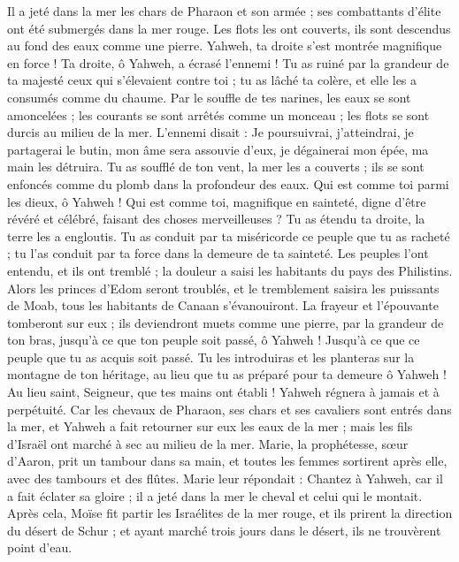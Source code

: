 \begin{multicols}{2}
Il a jeté dans la mer les chars de Pharaon et son armée ; ses combattants d’élite ont été submergés dans la mer rouge.
Les flots les ont couverts, ils sont descendus au fond des eaux comme une pierre\FTNT{}.
Yahweh, ta droite s'est montrée magnifique en force ! Ta droite, ô Yahweh, a écrasé l'ennemi\FTNT{} !
Tu as ruiné par la grandeur de ta majesté ceux qui s'élevaient contre toi ; tu as lâché ta colère, et elle les a consumés comme du chaume.
Par le souffle de tes narines, les eaux se sont amoncelées ; les courants se sont arrêtés comme un monceau ; les flots se sont durcis au milieu de la mer.
L'ennemi disait : Je poursuivrai, j'atteindrai, je partagerai le butin, mon âme sera assouvie d'eux, je dégainerai mon épée, ma main les détruira.
Tu as soufflé de ton vent, la mer les a couverts ; ils se sont enfoncés comme du plomb dans la profondeur des eaux.
Qui est comme toi parmi les dieux, ô Yahweh ! Qui est comme toi, magnifique en sainteté, digne d'être révéré et célébré, faisant des choses merveilleuses ?
Tu as étendu ta droite, la terre les a engloutis.
Tu as conduit par ta miséricorde ce peuple que tu as racheté ; tu l'as conduit par ta force dans la demeure de ta sainteté.
Les peuples l'ont entendu, et ils ont tremblé ; la douleur a saisi les habitants du pays des Philistins.
Alors les princes d'Edom seront troublés, et le tremblement saisira les puissants de Moab, tous les habitants de Canaan s’évanouiront.
La frayeur et l'épouvante tomberont sur eux ; ils deviendront muets comme une pierre, par la grandeur de ton bras, jusqu'à ce que ton peuple soit passé, ô Yahweh ! Jusqu'à ce que ce peuple que tu as acquis soit passé\FTNT{}.
Tu les introduiras et les planteras sur la montagne de ton héritage, au lieu que tu as préparé pour ta demeure ô Yahweh ! Au lieu saint, Seigneur, que tes mains ont établi !
Yahweh régnera à jamais et à perpétuité.
Car les chevaux de Pharaon, ses chars et ses cavaliers sont entrés dans la mer, et Yahweh a fait retourner sur eux les eaux de la mer ; mais les fils d'Israël ont marché à sec au milieu de la mer.
Marie, la prophétesse, sœur d'Aaron, prit un tambour dans sa main, et toutes les femmes sortirent après elle, avec des tambours et des flûtes.
Marie leur répondait : Chantez à Yahweh, car il a fait éclater sa gloire ; il a jeté dans la mer le cheval et celui qui le montait.
Après cela, Moïse fit partir les Israélites de la mer rouge, et ils prirent la direction du désert de Schur ; et ayant marché trois jours dans le désert, ils ne trouvèrent point d'eau.

\end{multicols}

